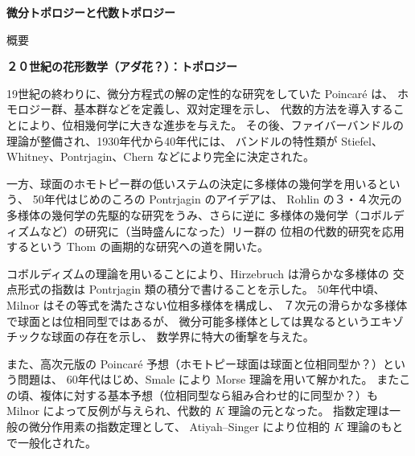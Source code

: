 \documentclass[uplatex,dvipdfmx]{jlreq}
\begin{document}
\begin{center}
  \vspace*{20pt}
  {\Huge\bfseries 微分トポロジーと代数トポロジー}

  \vspace{10pt}

  {\large 概要}
\end{center}
\vfill

\newpage

\begin{center}
{\large\bfseries ２０世紀の花形数学（アダ花？）：トポロジー}

\hspace*{\fill}{\large\bfseries 佐藤 肇（名大・多元数理）}
\end{center}

\medskip

19世紀の終わりに、微分方程式の解の定性的な研究をしていた Poincaré は、
ホモロジー群、基本群などを定義し、双対定理を示し、
代数的方法を導入することにより、位相幾何学に大きな進歩を与えた。
その後、ファイバーバンドルの理論が整備され、1930年代から40年代には、
バンドルの特性類が Stiefel、Whitney、Pontrjagin、Chern などにより完全に決定された。

一方、球面のホモトピー群の低いステムの決定に多様体の幾何学を用いるという、
50年代はじめのころの Pontrjagin のアイデアは、
Rohlin の３・４次元の多様体の幾何学の先駆的な研究をうみ、さらに逆に
多様体の幾何学（コボルディズムなど）の研究に（当時盛んになった）リー群の
位相の代数的研究を応用するという Thom の画期的な研究への道を開いた。

コボルディズムの理論を用いることにより、Hirzebruch は滑らかな多様体の
交点形式の指数は Pontrjagin 類の積分で書けることを示した。
50年代中頃、Milnor はその等式を満たさない位相多様体を構成し、
７次元の滑らかな多様体で球面とは位相同型ではあるが、
微分可能多様体としては異なるというエキゾチックな球面の存在を示し、
数学界に特大の衝撃を与えた。

また、高次元版の Poincaré 予想（ホモトピー球面は球面と位相同型か？）という問題は、
60年代はじめ、Smale により Morse 理論を用いて解かれた。
またこの頃、複体に対する基本予想（位相同型なら組み合わせ的に同型か？）も
Milnor によって反例が与えられ、代数的 $K$ 理論の元となった。
指数定理は一般の微分作用素の指数定理として、
Atiyah--Singer により位相的 $K$ 理論のもとで一般化された。
\end{document}
